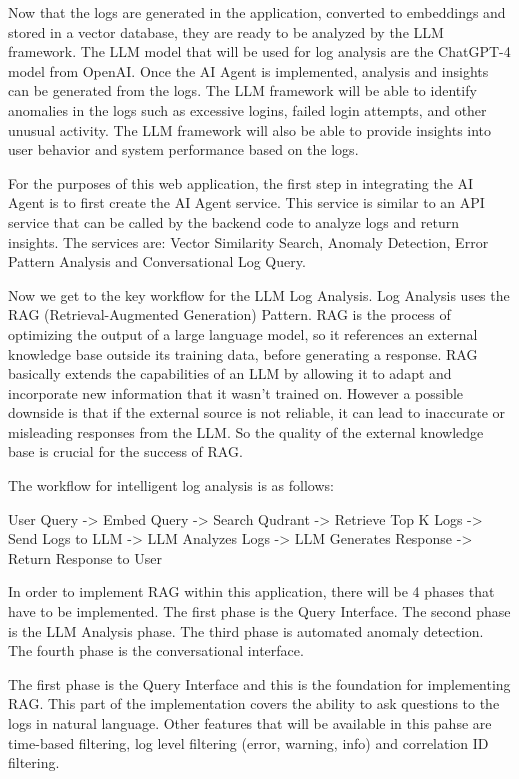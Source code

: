 \documentclass[sigconf]{acmart}
\begin{document}
Now that the logs are generated in the application, converted to embeddings and stored in a vector database, they are ready to be analyzed by the LLM framework. The LLM model that will be used for log analysis are the ChatGPT-4 model from OpenAI. Once the AI Agent is implemented, analysis and insights can be generated from the logs. The LLM framework will be able to identify anomalies in the logs such as excessive logins, failed login attempts, and other unusual activity. The LLM framework will also be able to provide insights into user behavior and system performance based on the logs.

For the purposes of this web application, the first step in integrating the AI Agent is to first create the AI Agent service. This service is similar to an API service that can be called by the backend code to analyze logs and return insights. The services are: Vector Similarity Search, Anomaly Detection, Error Pattern Analysis and Conversational Log Query. 

Now we get to the key workflow for the LLM Log Analysis. Log Analysis uses the RAG (Retrieval-Augmented Generation) Pattern. RAG is the process of optimizing the output of a large language model, so it references an external knowledge base outside its training data, before generating a response. RAG basically extends the capabilities of an LLM by allowing it to adapt and incorporate new information that it wasn't trained on. However a possible downside is that if the external source is not reliable, it can lead to inaccurate or misleading responses from the LLM. So the quality of the external knowledge base is crucial for the success of RAG.

The workflow for intelligent log analysis is as follows:


User Query -> Embed Query -> Search Qudrant -> Retrieve Top K Logs -> Send Logs to LLM -> LLM Analyzes Logs -> LLM Generates Response -> Return Response to User

In order to implement RAG within this application, there will be 4 phases that have to be implemented. The first phase is the Query Interface. The second phase is the LLM Analysis phase. The third phase  is automated anomaly detection. The fourth phase is the conversational interface.

The first phase is the Query Interface and this is the foundation for implementing RAG. This part of the implementation covers the ability to ask questions to the logs in natural language. Other features that will be available in this pahse are time-based filtering, log level filtering (error, warning, info) and correlation ID filtering.
\end{document}

